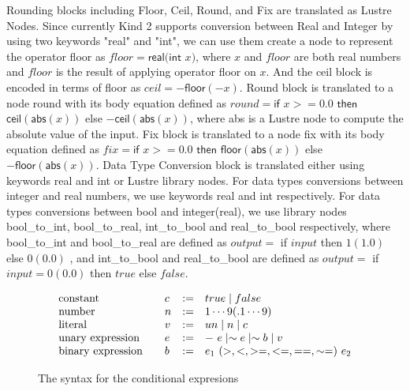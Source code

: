 \documentclass{article}
\begin{document}
Rounding blocks including \textsf{Floor, Ceil, Round}, and \textsf{Fix} are translated as Lustre Nodes. 
Since currently Kind 2 supports conversion between Real and Integer by using two keywords \textsf{"real"} and \textsf{"int"},
we can use them create a node to represent the operator \textsf{floor} as $floor = \textsf{real} (\textsf{int}$ $x)$, where $x$ and $floor$ are both real numbers and $floor$ is the result of applying operator \textsf{floor} on $x$. 
And the \textsf{ceil} block is encoded in terms of \textsf{floor} as $ceil = -\textsf{floor}(-x)$.
Round block is translated to a node \textsf{round} with its body equation defined as $round = \textsf{if}$ $x >= 0.0$ $\textsf{then}$ $\textsf{ceil}(\textsf{abs}(x))$ \textsf{else} $-\textsf{ceil}(\textsf{abs}(x))$, where \textsf{abs} is a Lustre node to compute the absolute value of the input.
Fix block is translated to a node \textsf{fix} with its body equation defined as $fix = \textsf{if}$ $x >= 0.0$ $\textsf{then}$ $\textsf{floor}(\textsf{abs}(x))$ \textsf{else} $-\textsf{floor}(\textsf{abs}(x))$.
Data Type Conversion block is translated either using keywords \textsf{real} and \textsf{int} or Lustre library nodes. 
For data types conversions between integer and real numbers, we use keywords \textsf{real} and \textsf{int} respectively. 
For data types conversions between \textsf{bool} and \textsf{integer(real)}, we use library nodes \textsf{bool\_to\_int, bool\_to\_real, int\_to\_bool} and \textsf{real\_to\_bool} respectively, where \textsf{bool\_to\_int} and \textsf{bool\_to\_real} are defined as $output =$ \textsf{if} $input$ \textsf{then} $1(1.0)$ \textsf{else} $0(0.0)$
, and \textsf{int\_to\_bool} and \textsf{real\_to\_bool} are defined as $output =$ \textsf{if} $input = 0(0.0)$ \textsf{then} $true$ \textsf{else} $false$.


\begin{figure}[t]
\[
\begin{array}{l@{\qquad}llll}
 \text{constant} & c & := & 
true \mid false
 \\[0ex]
 \text{number} & n & := & 
 1 \cdots 9 (.1 \cdots 9)
 \\[0ex]
  \text{literal} & v & := & 
u n \mid n \mid c
 \\[0ex]
\text{unary expression} & e & := & 
-\ e \mid \sim e \mid \sim b \mid v
 \\[0ex]
 \text{binary expression} & b & := & 
e_1\ (>, <, >=, <=, ==, \sim=)\ e_2 
 \\[0ex]
\end{array}       
\]
\caption{The syntax for the conditional expresions}
\label{fig:grammar}
\end{figure}
\end{document}
